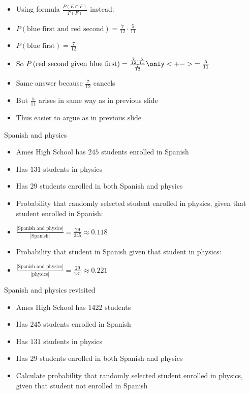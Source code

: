 \documentclass[handout]{beamer}
\theoremstyle{definition}
\begin{document}
\begin{frame}
\begin{itemize}
\item Using formula
$\frac{P\left(E\cap F\right)}{P\left(F\right)}$ instead:
\item $P\left(\text{blue first and red second}\right)
=\frac{7}{12}\cdot\frac{5}{11}$
\item $P\left(\text{blue first}\right)=\frac{7}{12}$
\item So $P\left(\text{red second given blue first}\right)
=\frac{\frac{7}{12}\cdot\frac{5}{11}}{\frac{7}{12}}
\only<+->{=\frac{5}{11}}$
\item Same answer because $\frac{7}{12}$ cancels
\item But $\frac{5}{11}$ arises in same way as in previous slide
\item Thus easier to argue as in previous slide
\end{itemize}
\end{frame}


\begin{frame}{Spanish and physics}
\begin{itemize}
\item Ames High School has $245$ students enrolled in Spanish
\item Has $131$ students in physics
\item Has $29$ students enrolled in both Spanish and physics
\item Probability that randomly selected student
enrolled in physics, given that student enrolled in Spanish:
\item $\frac{\left|\text{Spanish and physics}\right|}
{\left|\text{Spanish}\right|}
=\frac{29}{245}\approx 0.118$
\item Probability that student in Spanish given that student in physics:
\item $\frac{\left|\text{Spanish and physics}\right|}
{\left|\text{physics}\right|}
=\frac{29}{131}\approx 0.221$
\end{itemize}
\end{frame}

\begin{frame}{Spanish and physics revisited}
\begin{itemize}
\item Ames High School has 1422 students
\item Has $245$ students enrolled in Spanish
\item Has $131$ students in physics
\item Has $29$ students enrolled in both Spanish and physics
\item Calculate probability that randomly selected student
enrolled in physics, given that student \alert{not} enrolled in Spanish
\end{itemize}
\end{frame}
\end{document}
